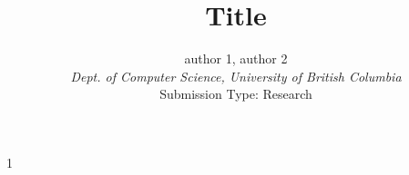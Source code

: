 \documentclass[10pt,twocolumn]{article}
\def\outline{0} %
\begin{document}
\title{Title}
\author{
        author 1,
        author 2
        \\
\small {\em  
		Dept. of Computer Science, University of British Columbia 
        } \\ [2mm]
\small Submission Type: Research
}
\date{}
\maketitle


\if\outline1
	
\else
	

    
	
	
	
	
	
	
	
	


	\clearpage
	\balance
	
	
\fi
\end{document}
